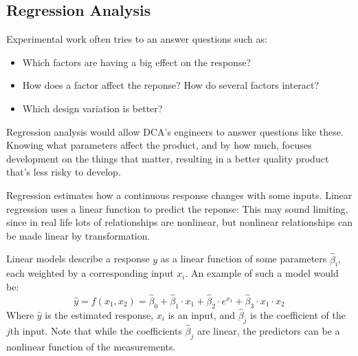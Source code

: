 \documentclass[11pt,a4paper,article]{memoir} %
\begin{document}
\subsection*{Regression Analysis}
Experimental work often tries to an answer questions such as:
\vspace{-10pt}
\begin{itemize}
\item Which factors are having a big effect on the response?
\item How does a factor affect the reponse? How do several factors interact?
\item Which design variation is better?
\end{itemize}
\vspace{-10pt}
 Regression analysis would allow DCA's engineers to answer questions like these. Knowing what parameters affect the product, and by how much,  focuses development on the things that matter, resulting in a better quality product that's less risky to develop.
 \par
 Regression estimates how a continuous response changes with some inputs. Linear regression uses a linear function to predict the reponse: This may sound limiting, since in real life lots of relationships are nonlinear, but nonlinear relationships can be made linear by transformation.
\par
  Linear models describe a response $y$ as a linear function of some parameters $\hat{\beta}_i$, each weighted by a corresponding input $x_i$. An example of such a model would be:
\begin{equation}
	\hat{y} = f(x_1, x_2) = \hat{\beta}_0 + \hat{\beta}_1 \cdot x_1 + \hat{\beta}_2 \cdot e^{x_1}+ \hat{\beta}_3 \cdot x_1 \cdot x_2
\end{equation}
Where $\hat{y}$ is the estimated response, $x_i$ is an input, and $\hat{\beta}_j$ is the coefficient of the $j$th input. Note that while the coefficients $\hat{\beta}_j$ are linear, the predictors can be a nonlinear function of the measurements.
\end{document}
